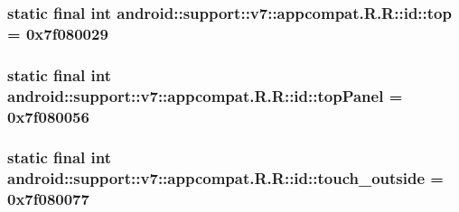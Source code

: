 \hypertarget{classandroid_1_1support_1_1v7_1_1appcompat_1_1_r_1_1id_2e1b4beea6d1f8c129843a5597c4ab3a}{
\subsubsection[{top}]{\setlength{\rightskip}{0pt plus 5cm}static final int android::support::v7::appcompat.R.R::id::top = 0x7f080029}}
\label{classandroid_1_1support_1_1v7_1_1appcompat_1_1_r_1_1id_2e1b4beea6d1f8c129843a5597c4ab3a}


\hypertarget{classandroid_1_1support_1_1v7_1_1appcompat_1_1_r_1_1id_0867a7d8e02b3b09e3768677786c2154}{
\subsubsection[{topPanel}]{\setlength{\rightskip}{0pt plus 5cm}static final int android::support::v7::appcompat.R.R::id::topPanel = 0x7f080056}}
\label{classandroid_1_1support_1_1v7_1_1appcompat_1_1_r_1_1id_0867a7d8e02b3b09e3768677786c2154}


\hypertarget{classandroid_1_1support_1_1v7_1_1appcompat_1_1_r_1_1id_fb65812910a8a84c3257820c30bc804a}{
\subsubsection[{touch\_\-outside}]{\setlength{\rightskip}{0pt plus 5cm}static final int android::support::v7::appcompat.R.R::id::touch\_\-outside = 0x7f080077}}
\label{classandroid_1_1support_1_1v7_1_1appcompat_1_1_r_1_1id_fb65812910a8a84c3257820c30bc804a}


